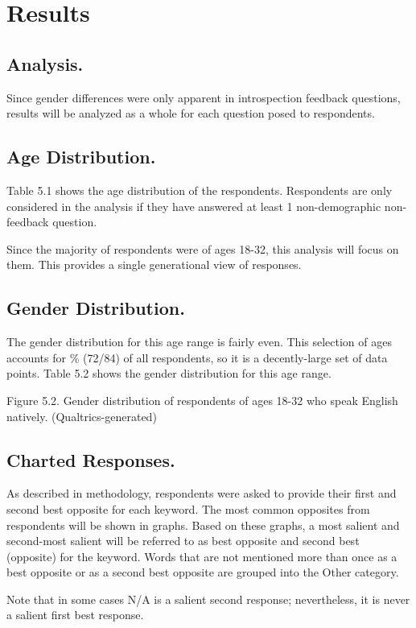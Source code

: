 \section {Results}
\subsection {Analysis.} Since gender differences were only apparent in introspection feedback questions, results will be analyzed as a whole for each question posed to respondents.

\subsection {Age Distribution.} Table 5.1 shows the age distribution of the respondents.  Respondents are only considered in the analysis if they have answered at least 1 non-demographic non-feedback question.

Since the majority of respondents were of ages 18-32, this analysis will focus on them.  This provides a single generational view of responses. 

\subsection {Gender Distribution.} The gender distribution for this age range is fairly even.  This selection of ages accounts for \% (72/84) of all respondents, so it is a decently-large set of data points. Table 5.2 shows the gender distribution for this age range.


	Figure 5.2. Gender distribution of respondents of ages 18-32 who speak English natively. (Qualtrics-generated)

\subsection {Charted Responses.} As described in methodology, respondents were asked to provide their first and second best opposite for each keyword.  The most common opposites from respondents will be shown in graphs.  Based on these graphs, a most salient and second-most salient will be referred to as best opposite and second best (opposite) for the keyword.  Words that are not mentioned more than once as a best opposite or as a second best opposite are grouped into the Other category.  
 
Note that in some cases N/A is a salient second response; nevertheless, it is never a salient first best response. 



